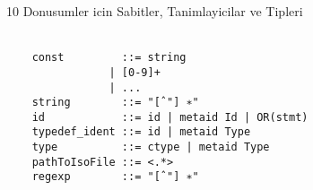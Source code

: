 \documentclass[22pt]{article}
\begin{document}
10 Donusumler icin Sabitler, Tanimlayicilar ve Tipleri\\
\\
\begin{lstlisting}
	const         ::= string 
		        | [0-9]+
		        | ...
	string        ::= "[ˆ"] ∗"
	id            ::= id | metaid Id | OR(stmt)
	typedef_ident ::= id | metaid Type
	type          ::= ctype | metaid Type
	pathToIsoFile ::= <.*>
	regexp        ::= "[ˆ"] ∗"
\end{lstlisting}
\end{document}
